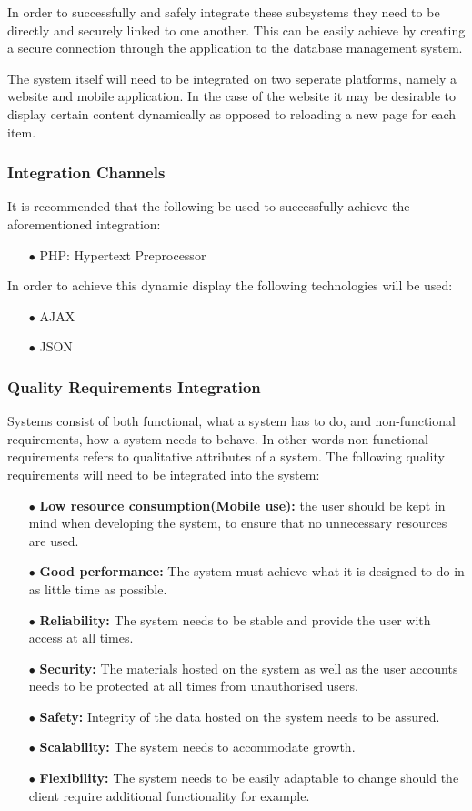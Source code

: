 \documentclass[a4paper,12pt]{article}
\begin{document}
In order to successfully and safely integrate these subsystems they need to be directly and securely linked to one another. This can be easily achieve by creating a secure connection through the application to the database management system. 

The system itself will need to be integrated on two seperate platforms, namely a website and mobile application. In the case of the website it may be desirable to display certain content dynamically as opposed to reloading a new page for each item.

\subsubsection{Integration Channels}
It is recommended that the following be used to successfully achieve the aforementioned integration:
\begin{itemize}
	\item[$\bullet$]PHP: Hypertext Preprocessor
\end{itemize}
In order to achieve this dynamic display the following technologies will be used:
 \begin{itemize}
	\item[$\bullet$]AJAX
	\item[$\bullet$]JSON
\end{itemize}

\subsubsection{Quality Requirements Integration}
Systems consist of both functional, what a system has to do, and non-functional requirements, how a system needs to behave. In other words non-functional requirements refers to qualitative attributes of a system. The following quality requirements will need to be integrated into the system:
\begin{itemize}
	\item[$\bullet$]\textbf{Low resource consumption(Mobile use): } the user should be kept in mind when developing the system, to ensure that no unnecessary resources are used.
	\item[$\bullet$]\textbf{Good performance: }The system must achieve what it is designed to do in as little time as possible.
	\item[$\bullet$]\textbf{Reliability: }The system needs to be stable and provide the user with access at all times.
	\item[$\bullet$]\textbf{Security: }The materials hosted on the system as well as the user accounts needs to be protected at all times from unauthorised users.
	\item[$\bullet$]\textbf{Safety: }Integrity of the data hosted on the system needs to be assured.
	\item[$\bullet$]\textbf{Scalability: }The system needs to accommodate growth.
	\item[$\bullet$]\textbf{Flexibility: }The system needs to be easily adaptable to change should the client require additional functionality for example.
\end{itemize}
\end{document}
